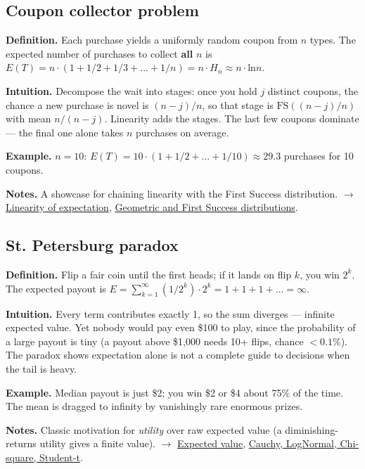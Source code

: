 \documentclass[11pt,a4paper]{article}
\begin{document}
\subsection{Coupon collector problem}\label{sec:coupon-collector-problem}

\textbf{Definition.} Each purchase yields a uniformly random coupon from $n$ types. The expected number of purchases to collect \textbf{all} $n$ is
$E(T) = n\cdot (1 + 1/2 + 1/3 + \ldots  + 1/n) = n\cdot H_n \approx  n\cdot \mathrm{ln} n$.

\textbf{Intuition.} Decompose the wait into stages: once you hold $j$ distinct coupons, the chance a new purchase is novel is $(n - j)/n$, so that stage is $\mathrm{FS}((n-j)/n)$ with mean $n/(n - j)$. Linearity adds the stages. The last few coupons dominate --- the final one alone takes $n$ purchases on average.

\textbf{Example.} $n = 10$: $E(T) = 10\cdot (1 + 1/2 + \ldots  + 1/10) \approx  29.3$ purchases for 10 coupons.

\textbf{Notes.} A showcase for chaining linearity with the First Success distribution. $\to$ \hyperref[sec:linearity-of-expectation]{Linearity of expectation}, \hyperref[sec:geometric-and-first-success-distributions]{Geometric and First Success distributions}.

\subsection{St. Petersburg paradox}\label{sec:st-petersburg-paradox}

\textbf{Definition.} Flip a fair coin until the first heads; if it lands on flip $k$, you win $2^{k}$. The expected payout is
$E = \sum _{k=1}^{\infty } (1/2^{k})\cdot 2^{k} = 1 + 1 + 1 + \ldots  = \infty$.

\textbf{Intuition.} Every term contributes exactly 1, so the sum diverges --- infinite expected value. Yet nobody would pay even \$100 to play, since the probability of a large payout is tiny (a payout above \$1,000 needs 10+ flips, chance $< 0.1\%$). The paradox shows expectation alone is not a complete guide to decisions when the tail is heavy.

\textbf{Example.} Median payout is just \$2; you win \$2 or \$4 about 75\% of the time. The mean is dragged to infinity by vanishingly rare enormous prizes.

\textbf{Notes.} Classic motivation for \textit{utility} over raw expected value (a diminishing-returns utility gives a finite value). $\to$ \hyperref[sec:expected-value]{Expected value}, \hyperref[sec:cauchy-lognormal-chi-square-student-t]{Cauchy, LogNormal, Chi-square, Student-t}.
\end{document}
